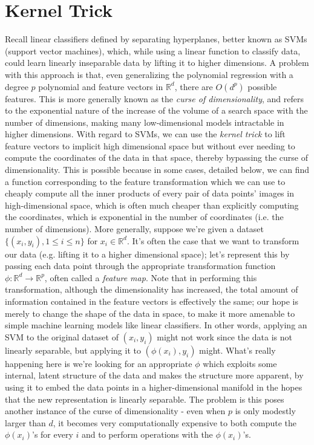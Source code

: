 \section{Kernel Trick}
Recall linear classifiers defined by separating hyperplanes, better known as SVMs (support vector machines), which, while using a linear function to classify data, could learn linearly inseparable data by lifting it to higher dimensions. A problem with this approach is that, even generalizing the polynomial regression with a degree $ p $ polynomial and feature vectors in $ \mathbb{R}^d $, there are $ O(d^p) $ possible features. This is more generally known as the \textit{curse of dimensionality}, and refers to the exponential nature of the increase of the volume of a search space with the number of dimensions, making many low-dimensional models intractable in higher dimensions.
\newline
With regard to SVMs, we can use the \textit{kernel trick} to lift feature vectors to implicit high dimensional space but without ever needing to compute the coordinates of the data in that space, thereby bypassing the curse of dimensionality. This is possible because in some cases, detailed below, we can find a function corresponding to the feature transformation which we can use to cheaply compute all the inner products of every pair of data points' images in high-dimensional space, which is often much cheaper than explicitly computing the coordinates, which is exponential in the number of coordinates (i.e. the number of dimensions).
\newline \newline
More generally, suppose we're given a dataset $ \{ (x_i, y_i), 1 \leq i \leq n \} $ for $ x_i \in \mathbb{R}^d $. It's often the case that we want to transform our data (e.g. lifting it to a higher dimensional space); let's represent this by passing each data point through the appropriate transformation function $ \phi: \mathbb{R}^d \rightarrow \mathbb{R}^p $, often called a \textit{feature map}. Note that in performing this transformation, although the dimensionality has increased, the total amount of information contained in the feature vectors is effectively the same; our hope is merely to change the shape of the data in space, to make it more amenable to simple machine learning models like linear classifiers. In other words, applying an SVM to the original dataset of $ (x_i, y_i) $ might not work since the data is not linearly separable, but applying it to $ (\phi(x_i), y_i) $ might. What's really happening here is we're looking for an appropriate $ \phi $ which exploits some internal, latent structure of the data and makes the structure more apparent, by using it to embed the data points in a higher-dimensional manifold in the hopes that the new representation is linearly separable. The problem is this poses another instance of the curse of dimensionality - even when $ p $ is only modestly larger than $ d $, it becomes very computationally expensive to both compute the $ \phi(x_i) $'s for every $ i $ and to perform operations with the $ \phi(x_i) $'s.
